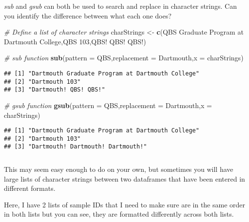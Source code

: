 \documentclass[
]{article}
\newenvironment{Shaded}{\begin{snugshade}}{\end{snugshade}}
\newcommand{\AttributeTok}[1]{\textcolor[rgb]{0.13,0.29,0.53}{#1}}
\newcommand{\CommentTok}[1]{\textcolor[rgb]{0.56,0.35,0.01}{\textit{#1}}}
\newcommand{\FunctionTok}[1]{\textcolor[rgb]{0.13,0.29,0.53}{\textbf{#1}}}
\newcommand{\NormalTok}[1]{#1}
\newcommand{\OtherTok}[1]{\textcolor[rgb]{0.56,0.35,0.01}{#1}}
\newcommand{\StringTok}[1]{\textcolor[rgb]{0.31,0.60,0.02}{#1}}
\begin{document}
\emph{sub} and \emph{gsub} can both be used to search and replace in
character strings. Can you identify the difference between what each one
does?

\begin{Shaded}
\begin{Highlighting}[]
\CommentTok{\# Define a list of character strings}
\NormalTok{charStrings }\OtherTok{\textless{}{-}} \FunctionTok{c}\NormalTok{(}\StringTok{\textquotesingle{}QBS Graduate Program at Dartmouth College\textquotesingle{}}\NormalTok{,}\StringTok{\textquotesingle{}QBS 103\textquotesingle{}}\NormalTok{,}\StringTok{\textquotesingle{}QBS! QBS! QBS!\textquotesingle{}}\NormalTok{)}

\CommentTok{\# sub function}
\FunctionTok{sub}\NormalTok{(}\AttributeTok{pattern =} \StringTok{\textquotesingle{}QBS\textquotesingle{}}\NormalTok{,}\AttributeTok{replacement =} \StringTok{\textquotesingle{}Dartmouth\textquotesingle{}}\NormalTok{,}\AttributeTok{x =}\NormalTok{ charStrings)}
\end{Highlighting}
\end{Shaded}

\begin{verbatim}
## [1] "Dartmouth Graduate Program at Dartmouth College"
## [2] "Dartmouth 103"                                  
## [3] "Dartmouth! QBS! QBS!"
\end{verbatim}

\begin{Shaded}
\begin{Highlighting}[]
\CommentTok{\# gsub function}
\FunctionTok{gsub}\NormalTok{(}\AttributeTok{pattern =} \StringTok{\textquotesingle{}QBS\textquotesingle{}}\NormalTok{,}\AttributeTok{replacement =} \StringTok{\textquotesingle{}Dartmouth\textquotesingle{}}\NormalTok{,}\AttributeTok{x =}\NormalTok{ charStrings)}
\end{Highlighting}
\end{Shaded}

\begin{verbatim}
## [1] "Dartmouth Graduate Program at Dartmouth College"
## [2] "Dartmouth 103"                                  
## [3] "Dartmouth! Dartmouth! Dartmouth!"
\end{verbatim}

\(~\)

This may seem easy enough to do on your own, but sometimes you will have
large lists of character strings between two dataframes that have been
entered in different formats.

Here, I have 2 lists of sample IDs that I need to make sure are in the
same order in both lists but you can see, they are formatted differently
across both lists.
\end{document}
